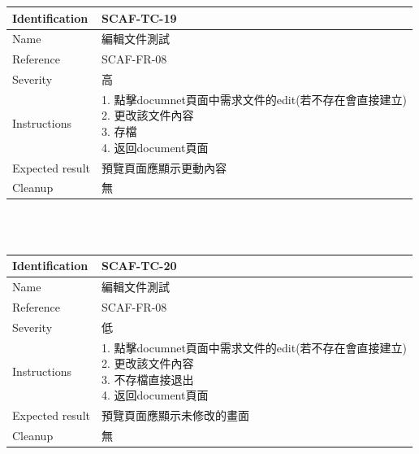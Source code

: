 \documentclass{report}
\begin{document}
\begin{tabularx}{\textwidth}{
  |p{}%
  |p{}|%
  }
  \hline
  \centering Identification &  SCAF-TC-19 \\
  \hline
  \centering Name & 編輯文件測試 \\
  \hline
  \centering Reference & SCAF-FR-08 \\
  \hline
  \centering Severity & 高 \\
  \hline
  \centering Instructions & 
  \makecell[l]{
    1. 點擊documnet頁面中需求文件的edit(若不存在會直接建立) \\
    2. 更改該文件內容  \\
    3. 存檔  \\
    4. 返回document頁面
  }\\
  \hline
  \centering Expected result & 預覽頁面應顯示更動內容 \\
  \hline
  \centering Cleanup & 無 \\
  \hline
\end{tabularx}
\\
\newline
\\
\begin{tabularx}{\textwidth}{
  |p{}%
  |p{}|%
  }
  \hline
  \centering Identification &  SCAF-TC-20 \\
  \hline
  \centering Name & 編輯文件測試 \\
  \hline
  \centering Reference & SCAF-FR-08 \\
  \hline
  \centering Severity & 低 \\
  \hline
  \centering Instructions & 
  \makecell[l]{
    1. 點擊documnet頁面中需求文件的edit(若不存在會直接建立) \\
    2. 更改該文件內容  \\
    3. 不存檔直接退出  \\
    4. 返回document頁面
  }\\
  \hline
  \centering Expected result & 預覽頁面應顯示未修改的畫面 \\
  \hline
  \centering Cleanup & 無 \\
  \hline
\end{tabularx}
\\
\newline
\\
\end{document}
